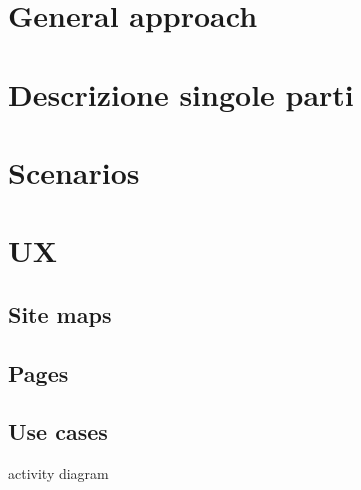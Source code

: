 \section{General approach}
\section{Descrizione singole parti}
\section{Scenarios}
\section{UX}
\subsection{Site maps}
\subsection{Pages}
\subsection{Use cases}
activity diagram